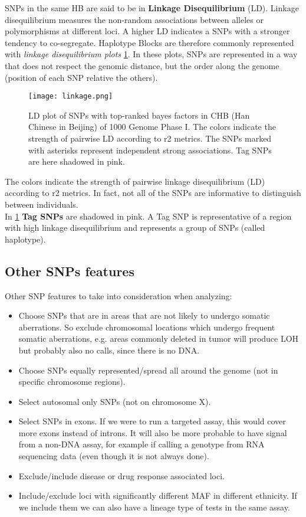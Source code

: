SNPs in the same HB are said to be in \textbf{Linkage Disequilibrium} (LD). Linkage disequilibrium measures the non-random associations between alleles or polymorphisms at different loci. A higher LD indicates a SNPs with a stronger tendency to co-segregate.
Haplotype Blocks are therefore commonly represented with \emph{linkage disequilibrium plots} \ref{fig:linkage}. In these plots, SNPs are represented in a way that does not respect the genomic distance, but the order along the genome (position of each SNP relative the others).

\begin{figure}[H]
	\centering
	\texttt{[image: linkage.png]}
	\caption{\label{fig:linkage}LD plot of SNPs with top-ranked bayes factors in CHB (Han Chinese in Beijing) of 1000 Genome Phase I. The colors indicate the
strength of pairwise LD according to r2 metrics. The SNPs marked with asterisks represent independent strong associations. Tag SNPs are here shadowed in pink.}
\end{figure}

The colors indicate the strength of pairwise linkage disequilibrium (LD) according to r2 metrics. In fact, not all of the SNPs are informative to distinguish between individuals. \\
In \ref{fig:linkage} \textbf{Tag SNPs} are shadowed in pink. A Tag SNP is representative of a region with high linkage disequilibrium and represents a group of SNPs (called haplotype).

\subsection{Other SNPs features}
Other SNP features to take into consideration when analyzing:
\begin{itemize}
	\item Choose SNPs that are in areas that are not likely to undergo somatic aberrations. So exclude chromosomal locations which undergo frequent somatic aberrations, e.g. areas commonly deleted in tumor will produce LOH but probably also no calls, since there is no DNA.
	\item Choose SNPs equally represented/spread all around the genome (not in specific chromosome regions).
	\item Select autosomal only SNPs (not on chromosome X).
	\item Select SNPs in exons. If we were to run a targeted assay, this would cover more exons instead of introns. It will also be more probable to have signal from a non-DNA assay, for example if calling a genotype from RNA sequencing data (even though it is not always done).
	\item Exclude/include disease or drug response associated loci.
	\item Include/exclude loci with significantly different MAF in different ethnicity. If we include them we can also have a lineage type of tests in the same assay.
\end{itemize}


